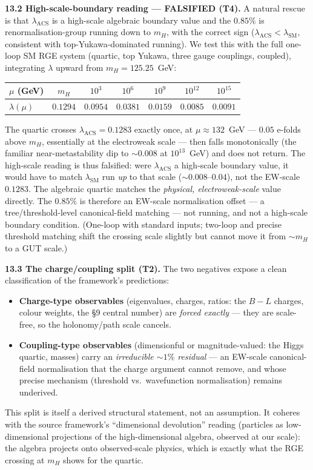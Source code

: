 \documentclass[11pt]{article}
\begin{document}
\textbf{13.2 High-scale-boundary reading --- FALSIFIED (T4).} A natural rescue is that $\lambda_{\text{ACS}}$ is a high-scale algebraic boundary value and the $0.85\%$ is renormalisation-group running down to $m_H$, with the correct sign ($\lambda_{\text{ACS}}<\lambda_{\text{SM}}$, consistent with top-Yukawa-dominated running). We test this with the full one-loop SM RGE system (quartic, top Yukawa, three gauge couplings, coupled), integrating $\lambda$ upward from $m_H=125.25$~GeV:
\begin{center}
\begin{tabular}{lcccccc}
\toprule
$\mu$ (GeV) & $m_H$ & $10^3$ & $10^6$ & $10^9$ & $10^{12}$ & $10^{15}$ \\
\midrule
$\lambda(\mu)$ & $0.1294$ & $0.0954$ & $0.0381$ & $0.0159$ & $0.0085$ & $0.0091$ \\
\bottomrule
\end{tabular}
\end{center}
The quartic crosses $\lambda_{\text{ACS}}=0.1283$ exactly once, at $\mu\approx132$~GeV --- $0.05$ e-folds above $m_H$, essentially at the electroweak scale --- then falls monotonically (the familiar near-metastability dip to $\sim0.008$ at $10^{13}$~GeV) and does not return. The high-scale reading is thus falsified: were $\lambda_{\text{ACS}}$ a high-scale boundary value, it would have to match $\lambda_{\text{SM}}$ run \emph{up} to that scale ($\sim0.008$--$0.04$), not the EW-scale $0.1283$. The algebraic quartic matches the \emph{physical, electroweak-scale} value directly. The $0.85\%$ is therefore an EW-scale normalisation offset --- a tree/threshold-level canonical-field matching --- not running, and not a high-scale boundary condition. (One-loop with standard inputs; two-loop and precise threshold matching shift the crossing scale slightly but cannot move it from $\sim m_H$ to a GUT scale.)

\textbf{13.3 The charge/coupling split (T2).} The two negatives expose a clean classification of the framework's predictions:
\begin{itemize}[nosep]
\item \textbf{Charge-type observables} (eigenvalues, charges, ratios: the $B\!-\!L$ charges, colour weights, the \S9 central number) are \emph{forced exactly} --- they are scale-free, so the holonomy/path scale cancels.
\item \textbf{Coupling-type observables} (dimensionful or magnitude-valued: the Higgs quartic, masses) carry an \emph{irreducible $\sim1\%$ residual} --- an EW-scale canonical-field normalisation that the charge argument cannot remove, and whose precise mechanism (threshold vs.\ wavefunction normalisation) remains underived.
\end{itemize}
This split is itself a derived structural statement, not an assumption. It coheres with the source framework's ``dimensional devolution'' reading (particles as low-dimensional projections of the high-dimensional algebra, observed at our scale): the algebra projects onto observed-scale physics, which is exactly what the RGE crossing at $m_H$ shows for the quartic.
\end{document}
